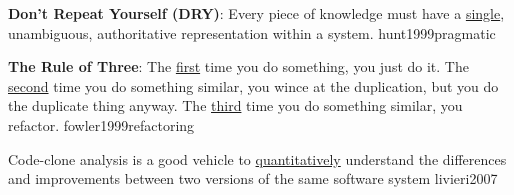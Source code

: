 \documentclass{article}
\begin{document}

  {\textbf{Don't Repeat Yourself (DRY)}: Every piece of knowledge must have a \ul{single}, unambiguous, authoritative representation within a system.}
  {hunt1999pragmatic}

  {\textbf{The Rule of Three}: The \ul{first} time you do something, you just do it. The \ul{second} time you do something similar, you wince at the duplication, but you do the duplicate thing anyway. The \ul{third} time you do something similar, you refactor.}
  {fowler1999refactoring}

  {Code-clone analysis is a good vehicle to \ul{quantitatively} understand the differences and improvements between two versions of the same software system}
  {livieri2007}
\end{document}
